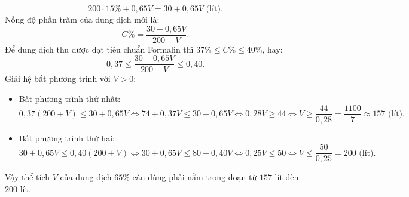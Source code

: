 \begin{bt}
{\begin{enumerate}[a)]
	$$ 200 \cdot 15\% + 0{,}65V = 30 + 0{,}65V\text{ (lít)}. $$
	Nồng độ phần trăm của dung dịch mới là:
	$$ C\% = \dfrac{30 + 0{,}65V}{200 + V}. $$
	Để dung dịch thu được đạt tiêu chuẩn Formalin thì $37\% \le C\% \le 40\%$, hay:
	$$ 0{,}37 \le \dfrac{30 + 0{,}65V}{200 + V} \le 0{,}40. $$
	Giải hệ bất phương trình với $V > 0$:
	\begin{itemize}
		\item Bất phương trình thứ nhất:
		$$ 0{,}37(200 + V) \le 30 + 0{,}65V \iff 74 + 0{,}37V \le 30 + 0{,}65V \iff 0{,}28V \ge 44 \iff V \ge \dfrac{44}{0{,}28} = \dfrac{1100}{7} \approx 157\text{ (lít)}. $$
		\item Bất phương trình thứ hai:
		$$ 30 + 0{,}65V \le 0{,}40(200 + V) \iff 30 + 0{,}65V \le 80 + 0{,}40V \iff 0{,}25V \le 50 \iff V \le \dfrac{50}{0{,}25} = 200\text{ (lít)}. $$
	\end{itemize}
	Vậy thể tích $V$ của dung dịch $65\%$ cần dùng phải nằm trong đoạn từ $157$ lít đến $200$ lít.
\end{enumerate}
}
\end{bt}

